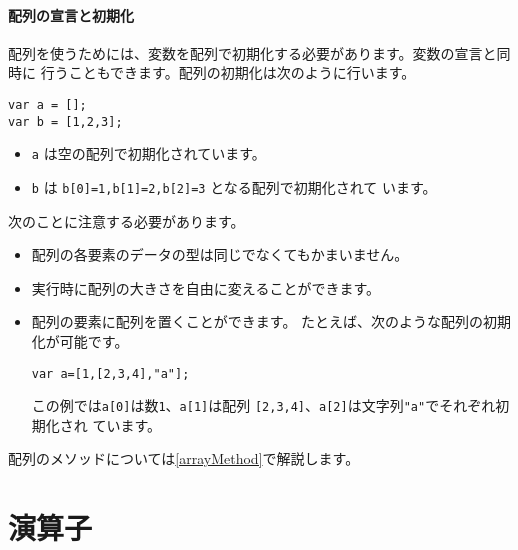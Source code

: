 \paragraph{配列の宣言と初期化}
配列を使うためには、変数を配列で初期化する必要があります。変数の宣言と同時に
行うこともできます。配列の初期化は次のように行います。
\begin{verbatim}
var a = [];
var b = [1,2,3];
\end{verbatim}
\begin{itemize}
 \item \verb+a+ は空の配列で初期化されています。
 \item \verb+b+ は \verb+b[0]=1,b[1]=2,b[2]=3+ となる配列で初期化されて
			 います。
\end{itemize}
次のことに注意する必要があります。
\begin{itemize}
 \item 配列の各要素のデータの型は同じでなくてもかまいません。
 \item 実行時に配列の大きさを自由に変えることができます。
 \item 配列の要素に配列を置くことができます。
			 たとえば、次のような配列の初期化が可能です。
\begin{verbatim}
var a=[1,[2,3,4],"a"];
\end{verbatim}
			 この例では\verb+a[0]+は数\texttt{1}、\verb+a[1]+は配列
			 \verb+[2,3,4]+、\verb+a[2]+は文字列\verb+"a"+でそれぞれ初期化され
			 ています。
\end{itemize}
配列のメソッドについては\ref{arrayMethod}で解説します。
\section{演算子}
